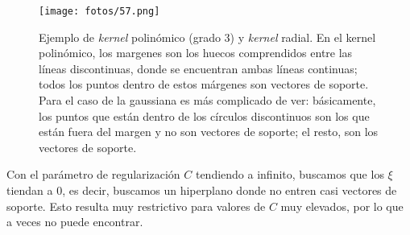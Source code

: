 \begin{figure}[h]
\centering
\texttt{[image: fotos/57.png]}
\caption{Ejemplo de \textit{kernel} polinómico (grado 3) y \textit{kernel} radial. En el kernel polinómico, los margenes son los huecos comprendidos entre las líneas discontinuas, donde se encuentran ambas líneas continuas; todos los puntos dentro de estos márgenes son vectores de soporte. Para el caso de la gaussiana es más complicado de ver: básicamente, los puntos que están dentro de los círculos discontinuos son los que están fuera del margen y no son vectores de soporte; el resto, son los vectores de soporte.}
\label{fig:12.2}
\end{figure}

Con el parámetro de regularización $C$ tendiendo a infinito, buscamos que los $\xi$ tiendan a 0, es decir, buscamos un hiperplano donde no entren casi vectores de soporte. Esto resulta muy restrictivo para valores de $C$ muy elevados, por lo que a veces no puede encontrar. 

